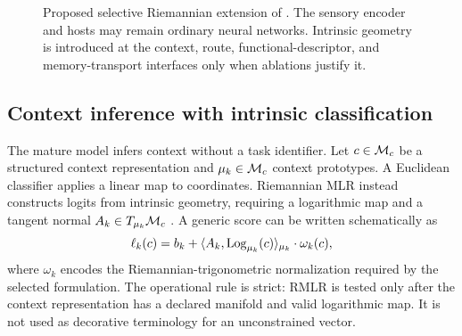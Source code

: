 \begin{figure}[H]
{%
}
\caption{Proposed selective Riemannian extension of \MMALS{}. The sensory encoder and hosts may remain ordinary neural networks. Intrinsic geometry is introduced at the context, route, functional-descriptor, and memory-transport interfaces only when ablations justify it.}
\label{fig:architecture}
\end{figure}

\subsection{Context inference with intrinsic classification}
The mature model infers context without a task identifier. Let $c\in\mathcal{M}_c$ be a structured context representation and $\mu_k\in\mathcal{M}_c$ context prototypes. A Euclidean classifier applies a linear map to coordinates. Riemannian MLR instead constructs logits from intrinsic geometry, requiring a logarithmic map and a tangent normal $A_k\in T_{\mu_k}\mathcal{M}_c$ \citep{chen2024rmlr,chen2026thesis}. A generic score can be written schematically as
\begin{equation}
  \ell_k(c)
  = b_k + \langle A_k,\operatorname{Log}_{\mu_k}(c)\rangle_{\mu_k}
  \cdot \omega_k(c),
  \label{eq:rmlr-context}
\end{equation}
where $\omega_k$ encodes the Riemannian-trigonometric normalization required by the selected formulation. The operational rule is strict: RMLR is tested only after the context representation has a declared manifold and valid logarithmic map. It is not used as decorative terminology for an unconstrained vector.

